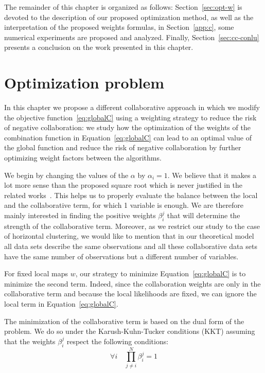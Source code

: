 The remainder of this chapter is organized as follows: Section~\ref{sec:opt-w} is devoted to the description of our proposed optimization method, as well as the interpretation of the proposed weights formulas, in Section~\ref{app:c}, some numerical experiments are proposed and analyzed. Finally, Section~\ref{sec:cc-conlu} presents a conclusion on the work presented in this chapter.

\label{sec:opt-w}

\section{Optimization problem}

In this chapter we  propose a different collaborative approach in which we modify the objective function~\eqref{eq:globalC} using a weighting  strategy to reduce the risk of negative collaboration: we study how the optimization of the weights of the combination function in Equation~\eqref{eq:globalC} can lead to an optimal value of the global function and reduce the risk of negative collaboration by further optimizing weight factors between the algorithms.

We begin by changing the values of the $\alpha$ by $\alpha_i=1$. We believe that it makes a lot more sense than the proposed square root which is never justified in the related works~\cite{grozavu2010topological,grozavu2011learning}. This helps us to properly evaluate the balance between the local and the collaborative term, for which 1 variable is enough.
We are therefore mainly interested in finding the positive weights $\beta^j_i$ that will determine the strength of the collaborative term. 
Moreover, as we restrict our study to the case of horizontal clustering, we would like to mention that in our theoretical model all data sets describe the same observations and all these collaborative data sets have the same number of observations but a different number of variables.  


For fixed local maps $w$, our strategy to minimize Equation~\eqref{eq:globalC} is to minimize the second term. Indeed, since the collaboration weights are only in the collaborative term and because the local likelihoods are fixed, we can ignore the local term in Equation~\eqref{eq:globalC}.

The minimization of the collaborative term is based on the dual form of the problem. We do so under the Karush-Kuhn-Tucker conditions (KKT) 
\cite{KKT1} assuming that the weights $\beta^j_i$ respect the following conditions:
$$\forall i \quad \prod_{j \neq i}^N \beta^j_i = 1$$ 

